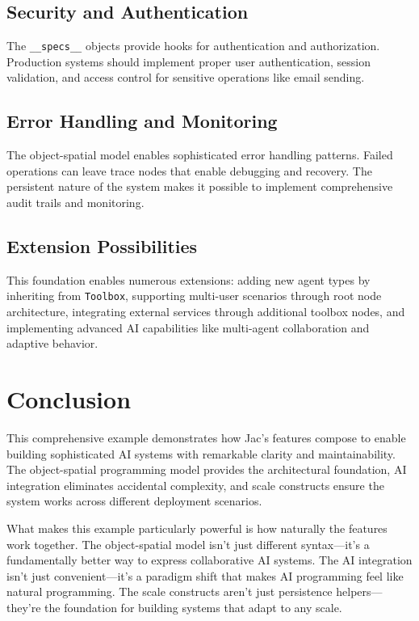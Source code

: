 \subsection{Security and Authentication}

The \texttt{\_\_specs\_\_} objects provide hooks for authentication and authorization. Production systems should implement proper user authentication, session validation, and access control for sensitive operations like email sending.

\subsection{Error Handling and Monitoring}

The object-spatial model enables sophisticated error handling patterns. Failed operations can leave trace nodes that enable debugging and recovery. The persistent nature of the system makes it possible to implement comprehensive audit trails and monitoring.

\subsection{Extension Possibilities}

This foundation enables numerous extensions: adding new agent types by inheriting from \texttt{Toolbox}, supporting multi-user scenarios through root node architecture, integrating external services through additional toolbox nodes, and implementing advanced AI capabilities like multi-agent collaboration and adaptive behavior.

\section{Conclusion}

This comprehensive example demonstrates how Jac's features compose to enable building sophisticated AI systems with remarkable clarity and maintainability. The object-spatial programming model provides the architectural foundation, AI integration eliminates accidental complexity, and scale constructs ensure the system works across different deployment scenarios.

What makes this example particularly powerful is how naturally the features work together. The object-spatial model isn't just different syntax—it's a fundamentally better way to express collaborative AI systems. The AI integration isn't just convenient—it's a paradigm shift that makes AI programming feel like natural programming. The scale constructs aren't just persistence helpers—they're the foundation for building systems that adapt to any scale.

